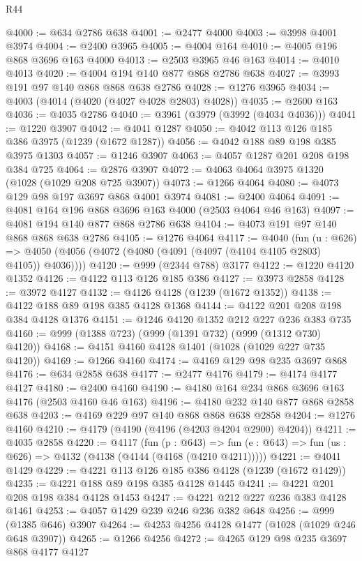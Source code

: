 \begin{lexlean}{R44}
\begin{coremodule}
@4000 := @634 @2786 @638
@4001 := @2477 @4000
@4003 := @3998 @4001 @3974
@4004 := @2400 @3965
@4005 := @4004 @164
@4010 := @4005 @196 @868 @3696 @163 @4000
@4013 := @2503 @3965 @46 @163
@4014 := @4010 @4013
@4020 := @4004 @194 @140 @877 @868 @2786 @638
@4027 := @3993 @191 @97 @140 @868 @868 @638 @2786
@4028 := @1276 @3965
@4034 := @4003 (@4014 (@4020 (@4027 @4028 @2803) @4028))
@4035 := @2600 @163
@4036 := @4035 @2786
@4040 := @3961 (@3979 (@3992 (@4034 @4036)))
@4041 := @1220 @3907
@4042 := @4041 @1287
@4050 := @4042 @113 @126 @185 @386 @3975 (@1239 (@1672 @1287))
@4056 := @4042 @188 @89 @198 @385 @3975 @1303
@4057 := @1246 @3907
@4063 := @4057 @1287 @201 @208 @198 @384 @725
@4064 := @2876 @3907
@4072 := @4063 @4064 @3975 @1320 (@1028 (@1029 @208 @725 @3907))
@4073 := @1266 @4064
@4080 := @4073 @129 @98 @197 @3697 @868 @4001 @3974
@4081 := @2400 @4064
@4091 := @4081 @164 @196 @868 @3696 @163 @4000 (@2503 @4064 @46 @163)
@4097 := @4081 @194 @140 @877 @868 @2786 @638
@4104 := @4073 @191 @97 @140 @868 @868 @638 @2786
@4105 := @1276 @4064
@4117 := @4040
    (fun (u : @626) =>
    @4050 (@4056 (@4072 (@4080 (@4091 (@4097 (@4104 @4105 @2803) @4105)) @4036))))
@4120 := @999 (@2344 @788) @3177
@4122 := @1220 @4120 @1352
@4126 := @4122 @113 @126 @185 @386
@4127 := @3973 @2858
@4128 := @3972 @4127
@4132 := @4126 @4128 (@1239 (@1672 @1352))
@4138 := @4122 @188 @89 @198 @385 @4128 @1368
@4144 := @4122 @201 @208 @198 @384 @4128 @1376
@4151 := @1246 @4120 @1352 @212 @227 @236 @383 @735
@4160 := @999 (@1388 @723) (@999 (@1391 @732) (@999 (@1312 @730) @4120))
@4168 := @4151 @4160 @4128 @1401 (@1028 (@1029 @227 @735 @4120))
@4169 := @1266 @4160
@4174 := @4169 @129 @98 @235 @3697 @868
@4176 := @634 @2858 @638
@4177 := @2477 @4176
@4179 := @4174 @4177 @4127
@4180 := @2400 @4160
@4190 := @4180 @164 @234 @868 @3696 @163 @4176 (@2503 @4160 @46 @163)
@4196 := @4180 @232 @140 @877 @868 @2858 @638
@4203 := @4169 @229 @97 @140 @868 @868 @638 @2858
@4204 := @1276 @4160
@4210 := @4179 (@4190 (@4196 (@4203 @4204 @2900) @4204))
@4211 := @4035 @2858
@4220 := @4117
    (fun (p : @643) =>
    fun (e : @643) => fun (us : @626) => @4132 (@4138 (@4144 (@4168 (@4210 @4211)))))
@4221 := @4041 @1429
@4229 := @4221 @113 @126 @185 @386 @4128 (@1239 (@1672 @1429))
@4235 := @4221 @188 @89 @198 @385 @4128 @1445
@4241 := @4221 @201 @208 @198 @384 @4128 @1453
@4247 := @4221 @212 @227 @236 @383 @4128 @1461
@4253 := @4057 @1429 @239 @246 @236 @382 @648
@4256 := @999 (@1385 @646) @3907
@4264 := @4253 @4256 @4128 @1477 (@1028 (@1029 @246 @648 @3907))
@4265 := @1266 @4256
@4272 := @4265 @129 @98 @235 @3697 @868 @4177 @4127

\end{coremodule}
\end{lexlean}
